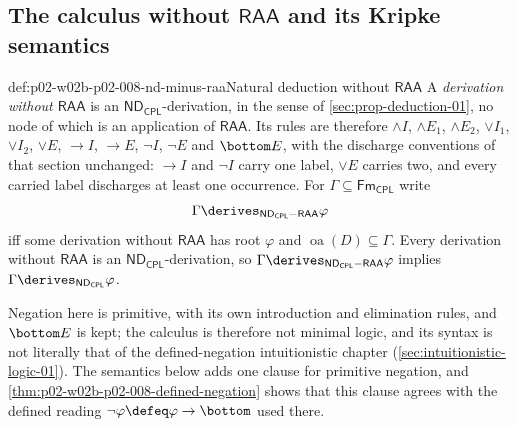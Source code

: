 \subsection{The calculus without \(\mathsf{RAA}\) and its Kripke semantics}
\label{sec:p02-w02b-p02-008-calculus}

\begin{hbdefinition}{def:p02-w02b-p02-008-nd-minus-raa}{Natural deduction without \(\mathsf{RAA}\)}
A \emph{derivation without \(\mathsf{RAA}\)} is an
\(\mathsf{ND}_{\mathsf{CPL}}\)-derivation, in the sense of
\cref{sec:prop-deduction-01}, no node of which is an application of
\(\mathsf{RAA}\).  Its rules are therefore \(\land I\), \(\land E_1\),
\(\land E_2\), \(\lor I_1\), \(\lor I_2\), \(\lor E\), \(\to I\), \(\to E\),
\(\neg I\), \(\neg E\) and \(\bottom E\), with the discharge conventions of
that section unchanged: \(\to I\) and \(\neg I\) carry one label, \(\lor E\)
carries two, and every carried label discharges at least one occurrence.
For \(\Gamma\subseteq\mathsf{Fm}_{\mathsf{CPL}}\) write
\[
  \Gamma\derives_{\mathsf{ND}_{\mathsf{CPL}}-\mathsf{RAA}}\varphi
\]
iff some derivation without \(\mathsf{RAA}\) has root \(\varphi\) and
\(\operatorname{oa}(D)\subseteq\Gamma\).  Every derivation without
\(\mathsf{RAA}\) is an \(\mathsf{ND}_{\mathsf{CPL}}\)-derivation, so
\(\Gamma\derives_{\mathsf{ND}_{\mathsf{CPL}}-\mathsf{RAA}}\varphi\) implies
\(\Gamma\derives_{\mathsf{ND}_{\mathsf{CPL}}}\varphi\).
\end{hbdefinition}

Negation here is primitive, with its own introduction and elimination
rules, and \(\bottom E\) is kept; the calculus is therefore not minimal
logic, and its syntax is not literally that of the defined-negation
intuitionistic chapter (\cref{sec:intuitionistic-logic-01}).  The semantics
below adds one clause for primitive negation, and
\cref{thm:p02-w02b-p02-008-defined-negation} shows that this clause agrees
with the defined reading \(\neg\varphi\defeq\varphi\to\bottom\) used there.

